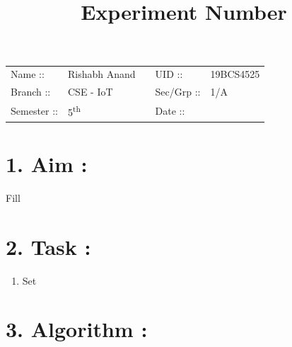\documentclass[14pt]{extarticle}
\title{%
    \textbf{
    \vspace{-3em} \\ 
    \Large Experiment Number\\
    \vspace{-4em}
    }
}
\author{}
\date{}
\begin{document}
\maketitle %

\section*{}
    \begin{tabular}{ llp{2cm}ll } 
        Name :: & Rishabh Anand & & UID :: & 19BCS4525  \\ 
        Branch :: & CSE - IoT & & Sec/Grp :: & 1/A \\ 
        Semester :: & 5\textsuperscript{th} & & Date :: & \shortdate{\today} \\
    \end{tabular}
    
\vspace{1em}

\section*{\normalsize 1. Aim :}

Fill

\section*{\normalsize 2. Task :}

\begin{enumerate}
  \item Set 
\end{enumerate}


\section*{\normalsize 3. Algorithm :}
\end{document}
